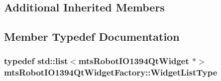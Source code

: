 \subsection*{Additional Inherited Members}


\subsection{Member Typedef Documentation}
\hypertarget{classmts_robot_i_o1394_qt_widget_factory_aaa614e39fe48800dab4b21edf6845c22}{
\subsubsection[{Widget\-List\-Type}]{\setlength{\rightskip}{0pt plus 5cm}typedef std\-::list$<${\bf mts\-Robot\-I\-O1394\-Qt\-Widget} $\ast$$>$ {\bf mts\-Robot\-I\-O1394\-Qt\-Widget\-Factory\-::\-Widget\-List\-Type}}}\label{classmts_robot_i_o1394_qt_widget_factory_aaa614e39fe48800dab4b21edf6845c22}


